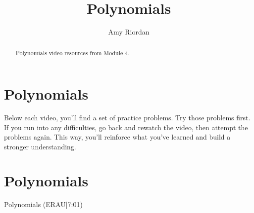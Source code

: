 \documentclass{ximera}
\title{Polynomials}
\author{Amy Riordan}
\begin{document}
\begin{abstract}
Polynomials video resources from Module 4.
\end{abstract}
\maketitle

\section*{Polynomials}

Below each video, you’ll find a set of practice problems. Try those problems first. If you run into any difficulties, go back and rewatch the video, then attempt the problems again. This way, you’ll reinforce what you’ve learned and build a stronger understanding.

\section*{Polynomials}

Polynomials (ERAU|7:01)

\end{document}
